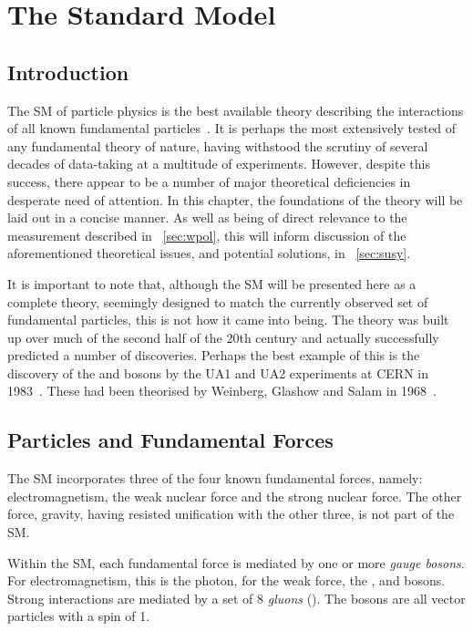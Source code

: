 \chapter{The Standard Model}
\label{sec:sm}
\section{Introduction}
The \acl{SM} of particle physics is the best available theory describing the
interactions of all known fundamental
particles~\cite{aitchison,griffiths,peskin_schroeder,sm_intro,glashow,weinberg,salam,englert,higgs}. It
is perhaps the most extensively tested of any fundamental theory of nature,
having withstood the scrutiny of several decades of data-taking at a multitude
of experiments. However, despite this success, there appear to be a number of
major theoretical deficiencies in desperate need of attention. In this chapter,
the foundations of the theory will be laid out in a concise manner. As well as
being of direct relevance to the measurement described in \chap~\ref{sec:wpol},
this will inform discussion of the aforementioned theoretical issues, and
potential solutions, in \chap~\ref{sec:susy}.

It is important to note that, although the \ac{SM} will be presented here as a
complete theory, seemingly designed to match the currently observed set of
fundamental particles, this is not how it came into being. The theory was built
up over much of the second half of the 20th century and actually successfully
predicted a number of discoveries. Perhaps the best example of this is the
discovery of the \PW and \PZ bosons by the UA1 and UA2 experiments at \ac{CERN}
in 1983~\cite{ua1_w,ua1_z}. These had been theorised by Weinberg,
Glashow and Salam in 1968~\cite{weinberg,glashow,salam}.

\section{Particles and Fundamental Forces}
\label{sec:theory:particles}
The \ac{SM} incorporates three of the four known fundamental forces, namely:
electromagnetism, the weak nuclear force and the strong nuclear force. The other
force, gravity, having resisted unification with the other three, is not part of
the \ac{SM}.

Within the \ac{SM}, each fundamental force is mediated by one or more \emph{gauge
bosons}. For electromagnetism, this is the photon, for the weak force, the
\PWp, \PWm and \PZ bosons. Strong interactions are mediated by a set of 8
\emph{gluons} (\Pg). The bosons are all vector particles with a spin of 1.

